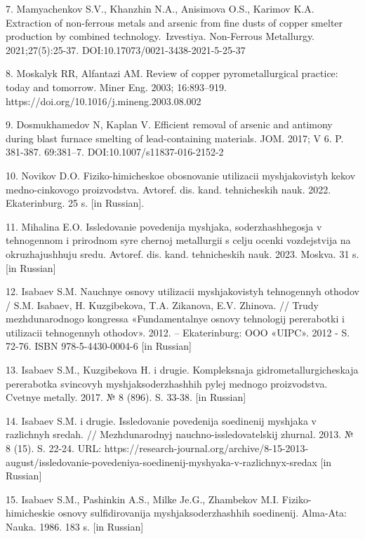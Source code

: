 7. Mamyachenkov S.V., Khanzhin N.A., Anisimova O.S., Karimov K.A.
Extraction of non-ferrous metals and arsenic from fine dusts of copper
smelter production by combined technology.~Izvestiya. Non-Ferrous
Metallurgy. 2021;27(5):25-37. DOI:10.17073/0021-3438-2021-5-25-37

8. Moskalyk RR, Alfantazi AM. Review of copper pyrometallurgical
practice: today and tomorrow. Miner Eng. 2003; 16:893--919.
https://doi.org/10.1016/j.mineng.2003.08.002

9. Dosmukhamedov N, Kaplan V. Efficient removal of arsenic and antimony
during blast furnace smelting of lead-containing materials. JOM. 2017; V
6. P. 381-387. 69:381--7. DOI:10.1007/s11837-016-2152-2

10. Novikov D.O. Fiziko-himicheskoe obosnovanie utilizacii
mysh\textquotesingle jakovistyh kekov medno-cinkovogo proizvodstva.
Avtoref. dis. kand. tehnicheskih nauk. 2022. Ekaterinburg. 25 s. {[}in
Russian{]}.

11. Mihalina E.O. Issledovanie povedenija mysh\textquotesingle jaka,
soderzhashhegosja v tehnogennom i prirodnom syr\textquotesingle e
chernoj metallurgii s cel\textquotesingle ju ocenki vozdejstvija na
okruzhajushhuju sredu. Avtoref. dis. kand. tehnicheskih nauk. 2023.
Moskva. 31 s. {[}in Russian{]}

12. Isabaev S.M. Nauchnye osnovy utilizacii
mysh\textquotesingle jakovistyh tehnogennyh othodov / S.M. Isabaev, H.
Kuzgibekova, T.A. Zikanova, E.V. Zhinova. // Trudy mezhdunarodnogo
kongressa «Fundamental\textquotesingle nye osnovy tehnologij pererabotki
i utilizacii tehnogennyh othodov». 2012. -- Ekaterinburg: OOO «UIPC».
2012 - S. 72-76. ISBN 978-5-4430-0004-6 {[}in Russian{]}

13. Isabaev S.M., Kuzgibekova H. i drugie. Kompleksnaja
gidrometallurgicheskaja pererabotka svincovyh
mysh\textquotesingle jaksoderzhashhih pylej mednogo proizvodstva.
Cvetnye metally. 2017. № 8 (896). S. 33-38. {[}in Russian{]}

14. Isabaev S.M. i drugie. Issledovanie povedenija soedinenij
mysh\textquotesingle jaka v razlichnyh sredah. // Mezhdunarodnyj
nauchno-issledovatel\textquotesingle skij zhurnal. 2013. № 8 (15). S.
22-24. URL:
https://research-journal.org/archive/8-15-2013-august/issledovanie-povedeniya-soedinenij-myshyaka-v-razlichnyx-sredax
{[}in Russian{]}

15. Isabaev S.M., Pashinkin A.S., Mil\textquotesingle ke Je.G.,
Zhambekov M.I. Fiziko-himicheskie osnovy
sul\textquotesingle fidirovanija mysh\textquotesingle jaksoderzhashhih
soedinenij. Alma-Ata: Nauka. 1986. 183 s. {[}in Russian{]}

